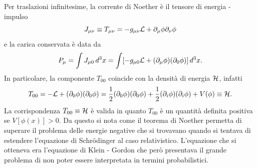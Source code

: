 Per traslazioni infinitesime, la corrente di Noether è il tensore di energia - impulso
\begin{equation}
    J_{\mu\nu} \equiv T_{\mu\nu} = -g_{\mu\nu}\mathcal{L} +\partial_\mu\phi\partial_\nu\phi
\end{equation}
e la carica conservata è data da 
\begin{equation}
    P_\mu = \int J_{\mu 0}\,d^3x = \int[-g_{\mu 0}\mathcal{L} + (\partial_\mu\phi)(\partial_0\phi)]\,d^3x.
\end{equation}
In particolare, la componente $T_{00}$ coincide con la densità di energia $\mathcal{H}$, infatti
\begin{equation}
    T_{00} = -\mathcal{L} + (\partial_0\phi)(\partial_0\phi) =\frac{1}{2}(\partial_0\phi)(\partial_0\phi) + \frac{1}{2}(\partial_i\phi)(\partial_i\phi) + V(\phi) \equiv \mathcal{H}.
\end{equation}
La corrispondenza $T_{00} \equiv \mathcal{H}$ è valida in quanto $T_{00}$ è un quantità definita positiva se $V[\phi(x)] > 0$. Da questo si nota come il teorema di Noether permetta di superare il problema delle energie negative che si trovavano quando si tentava di estendere l'equazione di Schr\"odinger al caso relativistico. L'equazione che si otteneva era l'equazione di Klein - Gordon che però presentava il grande problema di non poter essere interpretata in termini probabilistici. 

